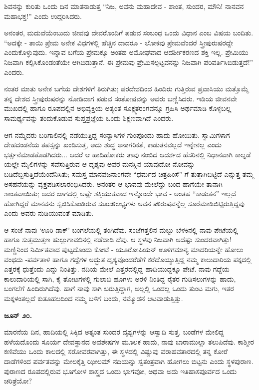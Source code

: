 ಶಿವನನ್ನು ಕುರಿತು ಒಂದು ದಿನ ಮಾತನಾಡುತ್ತ “ನಿಜ, ಅವನು ಮಹಾದೇವ - ಶಾಂತ, ಸುಂದರ, ಮೌನಿ! ನಾನವನ ಮಹಾಭಕ್ತ!” ಎಂದು ಉದ್ಗರಿಸಿದರು.

ಅನಂತರ, ಮದುವೆಯೆಂಬುದು ಜೀವವು ದೇವರೊಂದಿಗೆ ಪಡುವ ಸಂಬಂಧ ಒಂದು ವಿಧಾನ ಎಂಬ ವಿಷಯ ಬಂದಿತು. “ಅದಕ್ಕೇ - ತಾಯಿ ಪ್ರೇಮ ಅನೇಕ ವಿಧಗಳಲ್ಲಿ ಹೆಚ್ಚಿನ ದಾದರೂ - ಲೋಕವು ಪ್ರೇಮವೆಂದರೆ ಸ್ತ್ರೀಪುರುಷರದ್ದೇ ಎಂದುಕೊಳ್ಳುವುದು. ಇನ್ನಾವ ಬಗೆಯ ಪ್ರೇಮಕ್ಕೂ ಅಂತಹ ಅಮೋಘವಾದ ಆದರ್ಶೀಕರಣದ ಶಕ್ತಿ ಇಲ್ಲ. ಪ್ರೇಮಿಯು ನಿಜವಾಗಿ ಕಲ್ಪಿಸಿಕೊಂಡಂತೆಯೇ ಆಗಿಬಿಡುತ್ತಾನೆ. ಈ ಪ್ರೇಮವು ಪ್ರೇಮಿಸಲ್ಪಟ್ಟವನನ್ನು ನಿಜವಾಗಿ ಪರಿವರ್ತಿಸಿಬಿಡುತ್ತದೆ!” ಎಂದರು.

ನಂತರ ಮಾತು ಅನೇಕ ಬಗೆಯ ದೇಶಗಳಿಗೆ ತಿರುಗಿತು; ಪರದೇಶದಿಂದ ಹಿಂದಿರು ಗುತ್ತಿರುವ ಪ್ರವಾಸಿಯು ಮತ್ತೊಮ್ಮೆ ತನ್ನ ದೇಶದ ಸ್ತ್ರೀಪುರುಷರನ್ನು ನೋಡಿದಾಗ ಪಡುವ ಸಂತೋಷವನ್ನು ಅವರು ಬಣ್ಣಿಸಿದರು. ಇಡಿಯ ಜೀವನವೇ ಮುಖದಲ್ಲಿ ಹಾಗೂ ರೂಪದಲ್ಲಿನ ಅಭಿವ್ಯಕ್ತಿಯ ಅತ್ಯಂತ ಸೂಕ್ಷ್ಮತರಂಗವನ್ನೂ ಗ್ರಹಿಸಿ ಅರ್ಥಮಾಡಿ ಕೊಳ್ಳಬಲ್ಲ ಸಾಮರ್ಥ್ಯವನ್ನು ತಂದುಕೊಡುವ ಸುಪ್ತಪ್ರಜ್ಞೆಯ ಒಂದು ಶಿಕ್ಷಣವಾಗಿದೆ ಎಂದರು.

ಆಗ ನಮ್ಮೆದರು ಬರಿಗಾಲಿನಲ್ಲಿ ನಡೆಯುತ್ತಿದ್ದ ಸಂನ್ಯಾಸಿಗಳ ಗುಂಪೊಂದು ಹಾದು ಹೋಯಿತು. ಸ್ವಾಮಿಗಳಾಗ ದೇಹದಂಡನೆಯ ತಪಸ್ಸನ್ನು ಖಂಡಿಸುತ್ತ, ಅದು ಶುದ್ಧ ಅನಾಗರಿಕತೆ, ಕಾಡುತನವಲ್ಲದೆ ಇನ್ನೇನಲ್ಲ ಎಂದು ಭರ್ತ್ಸನೆಮಾಡತೊಡಗಿದರು... ಆದರೆ ಆ ಹಾದಿಹೋಕರು ತಾವು ನಂಬಿದ ಆದರ್ಶದ ಹೆಸರಿನಲ್ಲಿ ನಿಧಾನವಾಗಿ ಕಾಲ್ನಡೆ ಯಲ್ಲೇ ಮೈಲಿಗಳನ್ನು ಸವೆಸುತ್ತಿರುವ ಆ ದೃಶ್ಯವು ಅವರ ಮನಸ್ಸಿನ ಯಾವುದೋ ನೋವನ್ನು ಬಡಿದೆಬ್ಬಿಸುತ್ತಿದೆಯೆಂದೆನಿಸಿತು; ಸಮಸ್ತ ಮಾನವಜನಾಂಗವೇ “ಧರ್ಮದ ಚಿತ್ರಹಿಂಸೆ” ಗೆ ತುತ್ತಾಗಿಬಿಟ್ಟಿದೆ ಎನ್ನುತ್ತ ತಮ್ಮ ಅಸಹನೆಯನ್ನು ವ್ಯಕ್ತಪಡಿಸಲಾರಂಭಿಸಿದರು. ಅನಂತರ ಆ ಭಾವವು ಮೇಲೆದ್ದು ಬಂದ ಹಾಗೆಯೇ ತಾನಾಗಿ ಶಾಂತವಾಯಿತು; ಅದರ ಜಾಗದಲ್ಲಿ ಅಷ್ಟೇ ಶಕ್ತಿಯುತವಾದ ಇನ್ನೊಂದೇ ಭಾವ - ಅಂತಹ “ಕಾಡುತನ” ಇಲ್ಲದೆ ಹೋಗಿದ್ದರೆ ಮಾನವನು ಸೃಜಿಸಿಕೊಂಡಿರುವ ಸುಖಸೌಲಭ್ಯಗಳು ಅವನ ಪೌರುಷವನ್ನೆಲ್ಲ ಸೂರೆಮಾಡಿಬಿಟ್ಟಿರುತ್ತಿದ್ದವು ಎಂದು ಅವರು ನುಡಿಯುವಂತೆ ಮಾಡಿತು.

ಆ ಸಂಜೆ ನಾವು ‘ಊರಿ ಡಾಕ್’ ಬಂಗಲೆಯಲ್ಲಿ ತಂಗಿದೆವು. ಸಂಜೆಗತ್ತಲಿನ ಮಬ್ಬು ಬೆಳಕಿನಲ್ಲಿ ನಾವು ಪೇಟೆಯಲ್ಲಿ ಹಾಗೂ ಸುತ್ತಮುತ್ತಣ ಹುಲ್ಲುಗಾವಲಿನಲ್ಲಿ ನಡೆದಾಡಿ ದೆವು. ಆ ಸ್ಥಳವು ನಿಜವಾಗಿ ಅದೆಷ್ಟು ಸುಂದರವಾಗಿತ್ತು! ಮಣ್ಣಿನಿಂದ ನಿರ್ಮಿತವಾದ ಪುಟ್ಟದೊಂದು ಕೋಟೆ - ಯೂರೋಪಿಯನ್ ಊಳಿಗಮಾನ್ಯ ಮಾದರಿಯನ್ನೇ ಹೋಲು ವಂಥದು -ಪರ್ವತಾಳಿ ಹಾಗೂ ಗದ್ದೆಗಳ ಅದ್ಭುತ ದೃಶ್ಯವೊಂದರೆಡೆಗೆ ಕರೆದೊಯ್ಯುತ್ತಿದ್ದ ನಮ್ಮ ಕಾಲುದಾರಿಯ ಪಕ್ಕದಲ್ಲಿ ಎತ್ತರಕ್ಕೆ ಧುತ್ತೆಂದು ಎದ್ದು ನಿಂತಿತ್ತು. ನದಿಯ ಮೇಲೆ ಎತ್ತರದಲ್ಲಿದ್ದ ಹಾದಿಯುದ್ದಕ್ಕೂ ಪೇಟೆ. ನಾವು ಗದ್ದೆಯ ಕಾಲುದಾರಿಯಲ್ಲಿ ಸಾಗಿ, ಕೈ ತೋಟಗಳಲ್ಲಿ ಗುಲಾಬಿ ಹೂಗಳು ಅರಳಿ ನಿಂತಿದ್ದ ರೈತರ ಗುಡಿಸಲುಗಳನ್ನು ಹಾದು, ಬಂಗಲೆಗೆ ಹಿಂದಿರುಗಿದೆವು. ಹಾಗೆ ನಾವು ಸಾಗಿ ಬರುತ್ತಿದ್ದಾಗ, ಅಲ್ಲಲ್ಲಿ ಒಂದಲ್ಲ ಒಂದು ತುಂಟ ಮಗು, ಇತರ ಮಕ್ಕಳಂತಲ್ಲದೆ ಕುತೂಹಲದಿಂದ ನಮ್ಮ ಬಳಿಗೆ ಬಂದು, ನಮ್ಮೊಡನೆ ಆಟವಾಡುತ್ತಿತ್ತು.

\textbf{ಜೂನ್ ೨೦.}

ಮಾರನೆಯ ದಿನ, ಹಾದಿಯಲ್ಲಿ ಸಿಕ್ಕಿದ ಅತ್ಯಂತ ಸುಂದರ ದೃಶ್ಯಗಳನ್ನು ಆಸ್ವಾದಿ ಸುತ್ತ, ಬಂಡೆಗಳ ಮೇಲಿದ್ದ ಹಳೆಯದೊಂದು ಸೂರ್ಯ ದೇವಸ್ಥಾನದ ಅವಶೇಷಗಳ ಮೂಲಕ ಹಾದು, ನಾವು ಬಾರಾಮುಲ್ಲಾ ತಲುಪಿದೆವು. ಕಾಶ್ಮೀರ ಕಣಿವೆಯು ಒಂದು ಕಾಲದಲ್ಲಿ ಸರೋವರವಾಗಿತ್ತು, ಈ ಸ್ಥಳದಲ್ಲಿ ವಿಷ್ಣುವು ವರಾಹವತಾರದಲ್ಲಿ ತನ್ನ ಕೋರೆ ದಾಡೆಗಳಿಂದ ಪರ್ವತವನ್ನು ಮೇಲಕ್ಕೆತ್ತಿ ಝೀಲಮ್​ ನದಿಯನ್ನು ಸ್ವತಂತ್ರವಾಗಿ ಹೋಗಲು ಬಿಟ್ಟನು ಎಂದು ಸ್ಥಳಪುರಾಣ. ಪುರಾಣದ ರೂಪದಲ್ಲಿರುವ ಭೂಗೋಳ ಶಾಸ್ತ್ರದ ಒಂದು ಭಾಗವೋ, ಅಥವಾ ಅದು ಇತಿಹಾಸಪೂರ್ವದ ಒಂದು ಚರಿತ್ರೆಯೋ?

